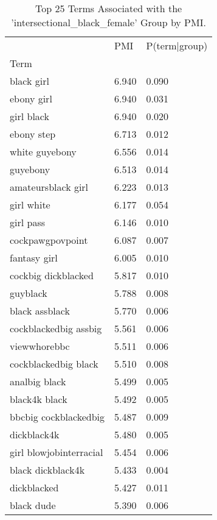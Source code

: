 \begin{table}[htbp]
\centering
\caption{Top 25 Terms Associated with the 'intersectional_black_female' Group by PMI.}
\label{tab:pmi-intersectional_black_women}
\begin{tabular}{lll}
\toprule
 & PMI & P(term|group) \\
Term &  &  \\
\midrule
black girl & 6.940 & 0.090 \\
ebony girl & 6.940 & 0.031 \\
girl black & 6.940 & 0.020 \\
ebony step & 6.713 & 0.012 \\
white guyebony & 6.556 & 0.014 \\
guyebony & 6.513 & 0.014 \\
amateursblack girl & 6.223 & 0.013 \\
girl white & 6.177 & 0.054 \\
girl pass & 6.146 & 0.010 \\
cockpawgpovpoint & 6.087 & 0.007 \\
fantasy girl & 6.005 & 0.010 \\
cockbig dickblacked & 5.817 & 0.010 \\
guyblack & 5.788 & 0.008 \\
black assblack & 5.770 & 0.006 \\
cockblackedbig assbig & 5.561 & 0.006 \\
viewwhorebbc & 5.511 & 0.006 \\
cockblackedbig black & 5.510 & 0.008 \\
analbig black & 5.499 & 0.005 \\
black4k black & 5.492 & 0.005 \\
bbcbig cockblackedbig & 5.487 & 0.009 \\
dickblack4k & 5.480 & 0.005 \\
girl blowjobinterracial & 5.454 & 0.006 \\
black dickblack4k & 5.433 & 0.004 \\
dickblacked & 5.427 & 0.011 \\
black dude & 5.390 & 0.006 \\
\bottomrule
\end{tabular}

\end{table}